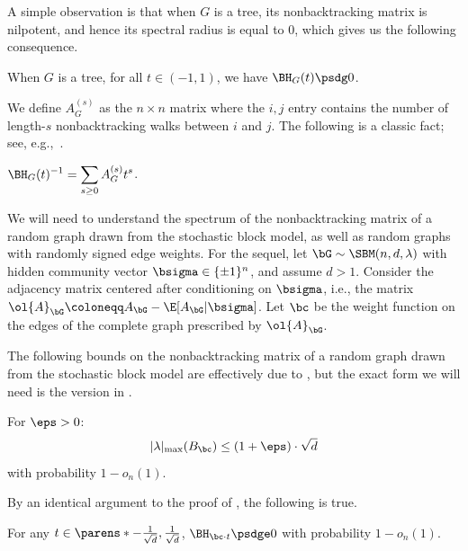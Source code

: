 \documentclass[11pt,letterpaper]{article}
\begin{document}
    A simple observation is that when $G$ is a tree, its nonbacktracking matrix is nilpotent, and hence its spectral radius is equal to $0$, which gives us the following consequence.
    \begin{corollary}
        \label{cor:bethe-tree-psd}
        When $G$ is a tree, for all $t\in(-1,1)$, we have $\BH_G(t)\psdg 0$.
    \end{corollary}

    We define $A_G^{(s)}$ as the $n\times n$ matrix where the $i,j$ entry contains the number of length-$s$ nonbacktracking walks between $i$ and $j$.
    The following is a classic fact; see, e.g.,~\cite[Equation (2.1)]{ST96}.

    \begin{fact}
        \label{fact:bethe-inverse}
        $\displaystyle \BH_G(t)^{-1} = \sum_{s\ge 0} A_G^{(s)}t^s$.
    \end{fact}

    We will need to understand the spectrum of the nonbacktracking matrix of a random graph drawn from the stochastic block model, as well as random graphs with randomly signed edge weights.
    For the sequel, let $\bG\sim\SBM(n,d,\lambda)$ with hidden community vector $\bsigma\in\{\pm1\}^n$, and assume $d > 1$.
    Consider the adjacency matrix centered after conditioning on $\bsigma$, i.e., the matrix $\ol{A}_{\bG} \coloneqq A_{\bG} - \E[A_{\bG}|\bsigma]$.
    Let $\bc$ be the weight function on the edges of the complete graph prescribed by $\ol{A}_{\bG}$.

    The following bounds on the nonbacktracking matrix of a random graph drawn from the stochastic block model are effectively due to \cite{BLM15}, but the exact form we will need is the version in \cite{LMR22}.
    \begin{lemma}
        For $\eps > 0$:
        \[
            |\lambda|_{\max}(B_{\bc}) \le (1+\eps)\cdot\sqrt{d}
        \]
        with probability $1-o_n(1)$.
    \end{lemma}

    By an identical argument to the proof of \cite[Theorem 5.1]{FM17}, the following is true.
    \begin{lemma}
        For any $t\in\parens*{-\frac{1}{\sqrt{d}},\frac{1}{\sqrt{d}}}$,
        \(
            \BH_{{\bc}\cdot t} \psdge 0
        \)
        with probability $1-o_n(1)$.
    \end{lemma}
\end{document}
